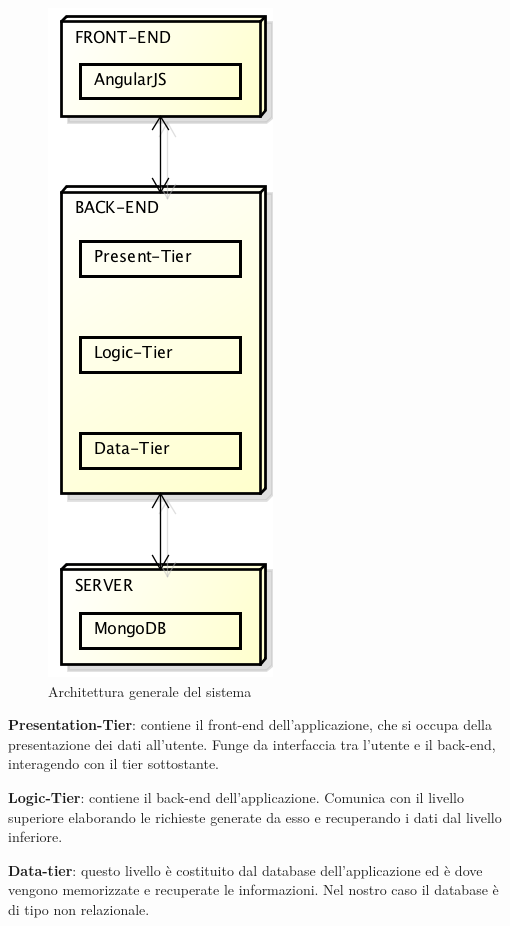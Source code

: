 \begin{figure}[h]
	\centering
	\includegraphics[height=0.6\textheight]{img/architettura_generale}
	\caption[Architettura generale del sistema]{Architettura generale del sistema}
\end{figure}

\textbf{Presentation-Tier}: contiene il \gls{front-end} dell'applicazione, che si occupa della presentazione dei dati all'utente. Funge da interfaccia tra l'utente e il \gls{back-end}, interagendo con il tier sottostante.

\textbf{Logic-Tier}: contiene il \gls{back-end} dell'applicazione. Comunica con il livello superiore elaborando le richieste generate da esso e recuperando i dati dal livello inferiore. 

\textbf{Data-tier}: questo livello è costituito dal \gls{database} dell'applicazione ed è dove vengono memorizzate e recuperate le informazioni. Nel nostro caso il \gls{database} è di tipo non relazionale.
